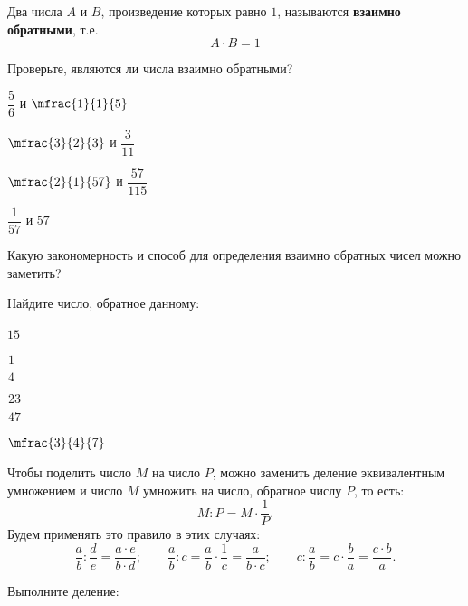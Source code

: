 \begin{class}[number=3]
	\begin{definit}
		Два числа \( A \) и \( B \), произведение которых равно \( 1 \), называются \textbf{взаимно обратными}, т.е.
		\[ A \cdot B = 1 \]
	\end{definit}
	\begin{listofex}
		\item Проверьте, являются ли числа взаимно обратными?
		\begin{enumcols}[itemcolumns=4]
			\item \( \dfrac{5}{6} \) и \( \mfrac{1}{1}{5} \)
			\item \( \mfrac{3}{2}{3} \) и \( \dfrac{3}{11} \)
			\item \( \mfrac{2}{1}{57} \) и \( \dfrac{57}{115} \)
			\item \( \dfrac{1}{57} \) и \( 57 \)
		\end{enumcols}
		Какую закономерность и способ для определения взаимно обратных чисел можно заметить?
		\item Найдите число, обратное данному:
		\begin{enumcols}[itemcolumns=4]
			\item \( 15 \)
			\item \( \dfrac{1}{4} \)
			\item \( \dfrac{23}{47} \)
			\item \( \mfrac{3}{4}{7} \)
		\end{enumcols}
	\end{listofex}
	\begin{definit}
		Чтобы поделить число \( M \) на число \( P \), можно заменить деление эквивалентным умножением и число \( M \) умножить на число, обратное числу \( P \), то есть:
		\[ M:P=M\cdot\dfrac{1}{P}. \]
		Будем применять это правило в этих случаях:
		\[ 
			\dfrac{a}{b}:\dfrac{d}{e}=\dfrac{a \cdot e}{b \cdot d};
			\qquad
			\dfrac{a}{b}:c=\dfrac{a}{b}\cdot\dfrac{1}{c}=\dfrac{a}{b \cdot c};
			\qquad
			c:\dfrac{a}{b}=c\cdot\dfrac{b}{a}=\dfrac{c \cdot b}{a}.
		\]
	\end{definit}
	\begin{listofex}
		\item Выполните деление:
		\begin{enumcols}[itemcolumns=4]

\end{enumcols}
\end{listofex}
\end{class}
